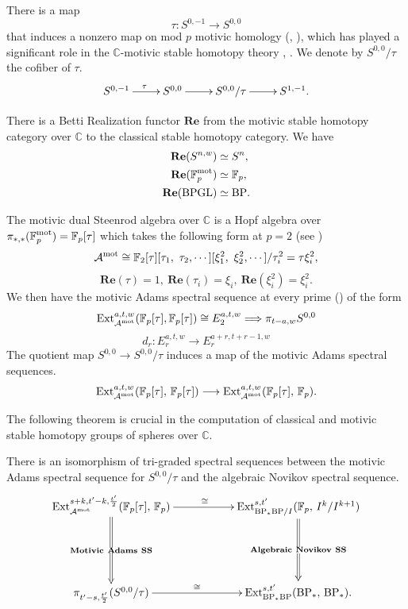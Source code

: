 There is a map
$$\tau: S^{0,-1} \longrightarrow S^{0,0}$$
that induces a nonzero map on mod $p$ motivic homology (\cite{Voe032}, \cite{HuKrizOrmsby}), which has played a significant role in the $\mathbb{C}$-motivic stable homotopy theory \cite{Isaksen}, \cite{GWX} \cite{IWX}. We denote by $S^{0,0}/\tau$ the cofiber of $\tau$.
$$\xymatrix{   
S^{0,-1} \ar[r]^\tau & S^{0,0} \ar[r] & S^{0,0}/\tau \ar[r] & S^{1,-1}.  
}$$

There is a Betti Realization functor $\mathbf{Re}$ from the motivic stable homotopy category over $\mathbb{C}$ to the classical stable homotopy category. We have 
\begin{align*}
\mathbf{Re}(S^{n,w}) & \simeq S^n,\\
\mathbf{Re}(\F_p^\textup{mot}) & \simeq \F_p,\\ %
\mathbf{Re}(\textup{BPGL}) & \simeq \BP.
\end{align*}

The motivic dual Steenrod algebra over $\mathbb{C}$ is a Hopf algebra over $\pi_{*,*}(\operatorname{\mathbb{F}}_p^{\textup{mot}}) = \operatorname{\mathbb{F}}_p[\tau]$
which takes the following form at $p=2$ (see \cite[Sec. 12]{Voe03})
$$\operatorname{\mathcal{A}}^\textup{mot} \cong \operatorname{\mathbb{F}}_2[\tau][\tau_1, \ \tau_2, \cdots][\xi_1^2, \ \xi_2^2, \cdots]/\tau_i^2 = \tau \xi_i^2,$$
$$\mathbf{Re}(\tau)=1, \ \mathbf{Re}(\tau_i) = \xi_i, \ \mathbf{Re}(\xi_i^2) = \xi_i^2.$$
We then have the motivic Adams spectral sequence at every prime (\cite{DuggerIsaksen}) of the form
$$ \operatorname{\mathrm{Ext}}_{\operatorname{\mathcal{A}}^\textup{mot}}^{a,t,w}(\operatorname{\mathbb{F}}_p[\tau], \operatorname{\mathbb{F}}_p[\tau]) \cong E_2^{a,t,w} \Longrightarrow \pi_{t-a,w}S^{0,0}$$
$$d_r:E_r^{a,t,w} \rightarrow E_r^{a+r, t+r-1,w}$$
The quotient map $S^{0,0} \rightarrow S^{0,0}/\tau$ induces a map of the motivic Adams spectral sequences.
$$\operatorname{\mathrm{Ext}}_{\operatorname{\mathcal{A}}^\textup{mot}}^{a,t,w}(\operatorname{\mathbb{F}}_p[\tau],\, \operatorname{\mathbb{F}}_p[\tau]) \longrightarrow \operatorname{\mathrm{Ext}}_{\operatorname{\mathcal{A}}^\textup{mot}}^{a,t,w}(\operatorname{\mathbb{F}}_p[\tau],\, \operatorname{\mathbb{F}}_p).$$

The following theorem is crucial in the computation of classical and motivic stable homotopy groups of spheres over $\mathbb{C}$.
\begin{thm} \label{MASS algNSS}
  There is an isomorphism of tri-graded spectral sequences between
  the motivic Adams spectral sequence for $S^{0,0}/\tau$ and
  the algebraic Novikov spectral sequence.
  \begin{displaymath}
    \xymatrix{
      \Ext_{{\A}^{\textup{mot}}}^{s+k, t'-k, \frac{t'}{2}}(\F_p[\tau],\, \F_p) \ar@{=>}[dd]|{\mathbf{Motivic \ Adams \ SS}}  \ar[rr]^{\cong} & &  \Ext_{\BP_*\BP/I}^{s,t'}(\F_p,\, I^{k}/I^{k+1}) \ar@{=>}[dd]|{\mathbf{Algebraic \ Novikov \ SS}} \\
      & & \\
      \pi_{t'-s, \frac{t'}{2}}(S^{0,0}/\tau)  \ar[rr]^-{\cong} & &   \Ext_{\BP_*\BP}^{s, t'}(\BP_*,\, \BP_*).
    }
  \end{displaymath}
\end{thm}

